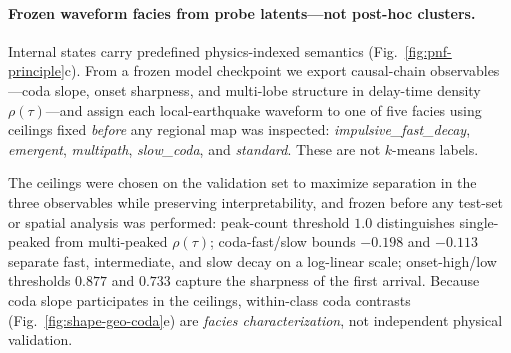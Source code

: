 \documentclass[twocolumn, 10pt]{article}
\begin{document}
\paragraph{Frozen waveform facies from probe latents---not post-hoc clusters.}
Internal states carry predefined physics-indexed semantics (Fig.~\ref{fig:pnf-principle}c). From a frozen model checkpoint we export causal-chain observables---coda slope, onset sharpness, and multi-lobe structure in delay-time density \(\rho(\tau)\)---and assign each local-earthquake waveform to one of five facies using ceilings fixed \emph{before} any regional map was inspected: \textit{impulsive\_fast\_decay}, \textit{emergent}, \textit{multipath}, \textit{slow\_coda}, and \textit{standard}. These are not \(k\)-means labels.

The ceilings were chosen on the validation set to maximize separation in the three observables while preserving interpretability, and frozen before any test-set or spatial analysis was performed: peak-count threshold \(1.0\) distinguishes single-peaked from multi-peaked \(\rho(\tau)\); coda-fast/slow bounds \(-0.198\) and \(-0.113\) separate fast, intermediate, and slow decay on a log-linear scale; onset-high/low thresholds \(0.877\) and \(0.733\) capture the sharpness of the first arrival. Because coda slope participates in the ceilings, within-class coda contrasts (Fig.~\ref{fig:shape-geo-coda}e) are \emph{facies characterization}, not independent physical validation.
\end{document}
